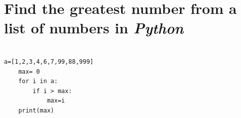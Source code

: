 
\section{Find the greatest number from a list of numbers in \textit{Python}}

\begin{verbatim}

a=[1,2,3,4,6,7,99,88,999]
    max= 0
    for i in a:
        if i > max:
            max=i
    print(max)

\end{verbatim}